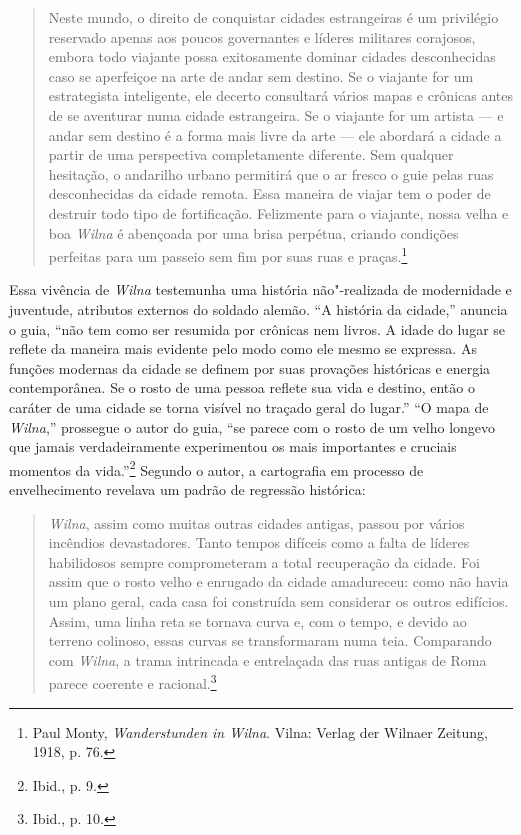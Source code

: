 %

\begin{quote}
Neste mundo, o direito de conquistar cidades estrangeiras é um
privilégio reservado apenas aos poucos governantes e líderes militares
corajosos, embora todo viajante possa exitosamente dominar cidades
desconhecidas caso se aperfeiçoe na arte de andar sem destino. Se o
viajante for um estrategista inteligente, ele decerto consultará vários
mapas e crônicas antes de se aventurar numa cidade estrangeira. Se o
viajante for um artista --- e andar sem destino é a forma mais livre da
arte --- ele abordará a cidade a partir de uma perspectiva completamente
diferente. Sem qualquer hesitação, o andarilho urbano permitirá que o ar
fresco o guie pelas ruas desconhecidas da cidade remota. Essa maneira de
viajar tem o poder de destruir todo tipo de fortificação. Felizmente
para o viajante, nossa velha e boa \textit{Wilna} é abençoada por uma brisa
perpétua, criando condições perfeitas para um passeio sem fim por suas
ruas e praças.\footnote{Paul Monty, \textit{Wanderstunden in Wilna}. Vilna: Verlag der Wilnaer Zeitung, 1918, p. 76.} 
\end{quote}

Essa vivência de \textit{Wilna} testemunha uma história não"-realizada de
modernidade e juventude, atributos externos do soldado alemão. ``A
história da cidade,'' anuncia o guia, ``não tem como ser resumida por
crônicas nem livros. A idade do lugar se reflete da maneira mais
evidente pelo modo como ele mesmo se expressa. As funções modernas da
cidade se definem por suas provações históricas e energia contemporânea.
Se o rosto de uma pessoa reflete sua vida e destino, então o caráter de
uma cidade se torna visível no traçado geral do lugar.'' ``O mapa de
\textit{Wilna},'' prossegue o autor do guia, ``se parece com o rosto de um velho
longevo que jamais verdadeiramente experimentou os mais importantes e
cruciais momentos da vida.''\footnote{Ibid., p. 9.} Segundo o autor, a
cartografia em processo de envelhecimento revelava um padrão de
regressão histórica:

\begin{quote}
\textit{Wilna}, assim como muitas outras cidades antigas, passou por vários
incêndios devastadores. Tanto tempos difíceis como a falta de líderes
habilidosos sempre comprometeram a total recuperação da cidade. Foi
assim que o rosto velho e enrugado da cidade amadureceu: como não havia
um plano geral, cada casa foi construída sem considerar os outros
edifícios. Assim, uma linha reta se tornava curva e, com o tempo, e
devido ao terreno colinoso, essas curvas se transformaram numa teia.
Comparando com \textit{Wilna}, a trama intrincada e entrelaçada das ruas antigas
de Roma parece coerente e racional.\footnote{Ibid., p. 10.}
\end{quote}

